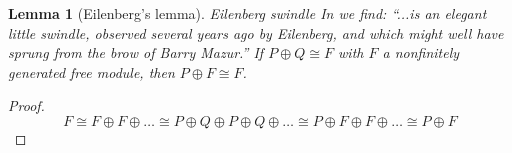 \documentclass[10pt,a4paper]{amsart}
\theoremstyle{plain}
\newtheorem{lemma}[subsection]{Lemma}
\theoremstyle{definition}
\theoremstyle{remark}
\numberwithin{equation}{subsection}
\newenvironment{reference}{\comment}{\endcomment}
\newenvironment{slogan}{\comment}{\endcomment}
\newenvironment{history}{\comment}{\endcomment}
\begin{document}
\begin{lemma}[Eilenberg's lemma]
\label{lemma-eilenberg-swindle}
\begin{slogan}
Eilenberg swindle
\end{slogan}
\begin{history}
In \cite{Bass} we find: ``...is an elegant little swindle,
observed several years ago by Eilenberg, and which
might well have sprung from the brow of Barry Mazur.''
\end{history}
\begin{reference}
\cite[Eilenberg's lemma]{Bass}
\end{reference}
If $P \oplus Q \cong F$ with $F$ a nonfinitely generated free module,
then $P \oplus F \cong F$.
\end{lemma}

\begin{proof}
$$
F \cong F \oplus F \oplus \ldots \cong
P \oplus Q \oplus P \oplus Q \oplus \ldots \cong
P \oplus F \oplus F \oplus \ldots \cong P \oplus F
$$
\end{proof}
\end{document}
